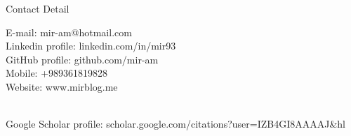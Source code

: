 \documentclass{resume} %
\begin{document}


\begin{rSection}{Contact Detail}

\begin{multicols}{2}
E-mail: mir-am@hotmail.com \\
Linkedin profile: linkedin.com/in/mir93 \\
GitHub profile: github.com/mir-am \\
\vfill\null
\columnbreak
Mobile: +989361819828\\
Website: www.mirblog.me\\
\end{multicols}
~\\[-1.5cm]
Google Scholar profile: scholar.google.com/citations?user=IZB4GI8AAAAJ\&hl
	
	

	



	
\end{rSection}

\end{document}
